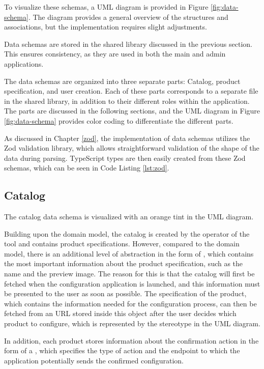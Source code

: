 To visualize these schemas, a UML diagram is provided in Figure \ref{fig:data-schema}. The diagram provides a general overview of the structures and associations, but the implementation requires slight adjustments.

Data schemas are stored in the shared library discussed in the previous section. This ensures consistency, as they are used in both the main and admin applications. 

The data schemas are organized into three separate parts: Catalog, product specification, and user creation. Each of these parts corresponds to a separate file in the shared library, in addition to their different roles within the application. The parts are discussed in the following sections, and the UML diagram in Figure \ref{fig:data-schema} provides color coding to differentiate the different parts.

As discussed in Chapter \ref{zod}, the implementation of data schemas utilizes the Zod validation library, which allows straightforward validation of the shape of the data during parsing. TypeScript types are then easily created from these Zod schemas, which can be seen in Code Listing \ref{lst:zod}. \cite{Wycliffe2023} 

\subsection{Catalog}

The catalog data schema is visualized with an orange tint in the UML diagram.

Building upon the domain model, the catalog is created by the operator of the tool and contains product specifications. However, compared to the domain model, there is an additional level of abstraction in the form of , which contains the most important information about the product specification, such as the name and the preview image. The reason for this is that the catalog will first be fetched when the configuration application is launched, and this information must be presented to the user as soon as possible. The specification of the product, which contains the information needed for the configuration process, can then be fetched from an URL stored inside this object after the user decides which product to configure, which is represented by the stereotype  in the UML diagram.

In addition, each product stores information about the confirmation action in the form of a , which specifies the type of action and the endpoint to which the application potentially sends the confirmed configuration.

